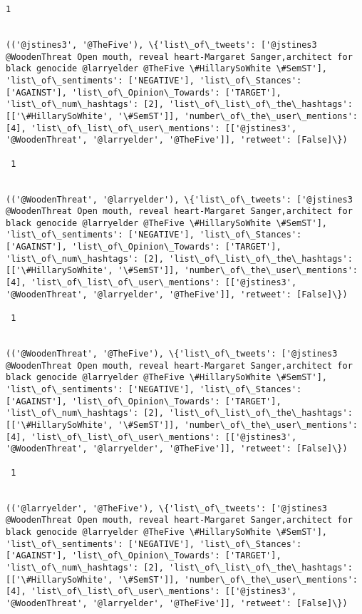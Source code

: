 \documentclass[11pt]{article}
\begin{document}
\begin{Verbatim}[commandchars=\\\{\}]
 1
 

(('@jstines3', '@TheFive'), \{'list\_of\_tweets': ['@jstines3 @WoodenThreat Open mouth, reveal heart-Margaret Sanger,architect for black genocide @larryelder @TheFive \#HillarySoWhite \#SemST'], 'list\_of\_sentiments': ['NEGATIVE'], 'list\_of\_Stances': ['AGAINST'], 'list\_of\_Opinion\_Towards': ['TARGET'], 'list\_of\_num\_hashtags': [2], 'list\_of\_list\_of\_the\_hashtags': [['\#HillarySoWhite', '\#SemST']], 'number\_of\_the\_user\_mentions': [4], 'list\_of\_list\_of\_user\_mentions': [['@jstines3', '@WoodenThreat', '@larryelder', '@TheFive']], 'retweet': [False]\})

 1
 

(('@WoodenThreat', '@larryelder'), \{'list\_of\_tweets': ['@jstines3 @WoodenThreat Open mouth, reveal heart-Margaret Sanger,architect for black genocide @larryelder @TheFive \#HillarySoWhite \#SemST'], 'list\_of\_sentiments': ['NEGATIVE'], 'list\_of\_Stances': ['AGAINST'], 'list\_of\_Opinion\_Towards': ['TARGET'], 'list\_of\_num\_hashtags': [2], 'list\_of\_list\_of\_the\_hashtags': [['\#HillarySoWhite', '\#SemST']], 'number\_of\_the\_user\_mentions': [4], 'list\_of\_list\_of\_user\_mentions': [['@jstines3', '@WoodenThreat', '@larryelder', '@TheFive']], 'retweet': [False]\})

 1
 

(('@WoodenThreat', '@TheFive'), \{'list\_of\_tweets': ['@jstines3 @WoodenThreat Open mouth, reveal heart-Margaret Sanger,architect for black genocide @larryelder @TheFive \#HillarySoWhite \#SemST'], 'list\_of\_sentiments': ['NEGATIVE'], 'list\_of\_Stances': ['AGAINST'], 'list\_of\_Opinion\_Towards': ['TARGET'], 'list\_of\_num\_hashtags': [2], 'list\_of\_list\_of\_the\_hashtags': [['\#HillarySoWhite', '\#SemST']], 'number\_of\_the\_user\_mentions': [4], 'list\_of\_list\_of\_user\_mentions': [['@jstines3', '@WoodenThreat', '@larryelder', '@TheFive']], 'retweet': [False]\})

 1
 

(('@larryelder', '@TheFive'), \{'list\_of\_tweets': ['@jstines3 @WoodenThreat Open mouth, reveal heart-Margaret Sanger,architect for black genocide @larryelder @TheFive \#HillarySoWhite \#SemST'], 'list\_of\_sentiments': ['NEGATIVE'], 'list\_of\_Stances': ['AGAINST'], 'list\_of\_Opinion\_Towards': ['TARGET'], 'list\_of\_num\_hashtags': [2], 'list\_of\_list\_of\_the\_hashtags': [['\#HillarySoWhite', '\#SemST']], 'number\_of\_the\_user\_mentions': [4], 'list\_of\_list\_of\_user\_mentions': [['@jstines3', '@WoodenThreat', '@larryelder', '@TheFive']], 'retweet': [False]\})


\end{Verbatim}
\end{document}
